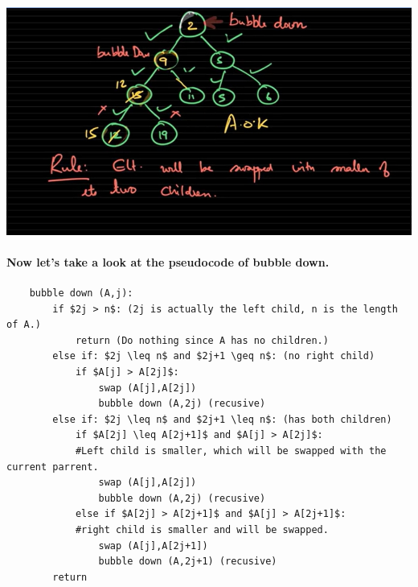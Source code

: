 \documentclass{article}
\begin{document}
\includegraphics[width=\textwidth]{bubbledownmultipletimes}



\paragraph{Now let's take a look at the pseudocode of bubble down.\\}

\begin{verbatim}
    bubble down (A,j):
        if $2j > n$: (2j is actually the left child, n is the length of A.)
            return (Do nothing since A has no children.)
        else if: $2j \leq n$ and $2j+1 \geq n$: (no right child)
            if $A[j] > A[2j]$:
                swap (A[j],A[2j])
                bubble down (A,2j) (recusive)
        else if: $2j \leq n$ and $2j+1 \leq n$: (has both children)
            if $A[2j] \leq A[2j+1]$ and $A[j] > A[2j]$: 
            #Left child is smaller, which will be swapped with the current parrent.
                swap (A[j],A[2j])
                bubble down (A,2j) (recusive)
            else if $A[2j] > A[2j+1]$ and $A[j] > A[2j+1]$: 
            #right child is smaller and will be swapped.
                swap (A[j],A[2j+1])
                bubble down (A,2j+1) (recusive)
        return
\end{verbatim}
\end{document}
